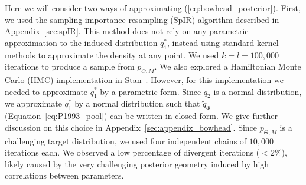 \documentclass[a4paper, notitlepage, 11pt]{article}
\begin{document}
Here we will consider two ways of approximating (\ref{eq:bowhead_posterior}).
First, we used the sampling importance-resampling (SpIR) algorithm described in Appendix~\ref{sec:spIR}.
This method does not rely on any parametric approximation to the induced distribution $q_1^\ast$, instead using standard kernel methods to approximate the density at any point.
We used $k = l = 100, 000$ iterations to produce a sample from $p_{\Theta, M}$.
We also explored a Hamiltonian Monte Carlo (HMC) implementation in Stan~\citep{Carpenter2017}.
However, for this implementation we needed to approximate $q_1^\ast$ by a parametric form.
Since $q_2$ is a normal distribution, we approximate $q_1^\ast$ by a normal distribution such that $\tilde{q}_{\Phi}$ (Equation~\ref{eq:P1993_pool}) can be written in closed-form.
We give further discussion on this choice in Appendix~\ref{sec:appendix_bowhead}.
Since $p_{\Theta, M}$ is a challenging target distribution, we used four independent chains of  $10,000$ iterations each.
We observed a low percentage of divergent iterations ($<$2\%), likely caused by the very challenging posterior geometry induced by high correlations between parameters.
\end{document}
